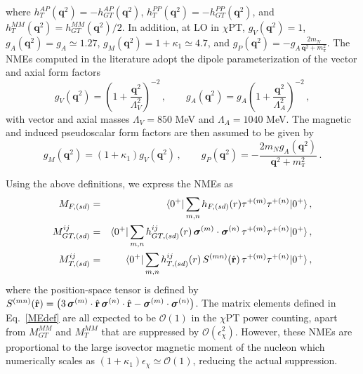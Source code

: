 \documentclass[letterpaper,11pt]{article}
\newcommand{\boldsigma}{\mbox{\boldmath $\sigma$}}
\renewcommand{\vec}[1]{{\mathbf #1}}
\newcommand{\sq}{^{2}}
\newcommand{\nn}{\nonumber}
\begin{document}
where $h^{AP}_T(\vec q^2) = -h^{AP}_{GT}(\vec q^2)$, $h^{PP}_T(\vec q^2) = - h^{PP}_{GT}(\vec q^2)$,  and $h^{MM}_{T}(\vec q^2) = h^{MM}_{GT}(\vec q^2)/2$. In addition, at LO in $\chi$PT, 
$g_V(\vec q^2)=1$,
$g_A(\vec q^2)=g_A\simeq 1.27$, $g_M(\vec q\sq) = 1+\kappa_1\simeq 4.7$,  and 	$g_P(\vec q^2) =-g_A\frac{2m_N}{\vec q\sq+m_\pi\sq}$. 
The NMEs computed in the literature \cite{Hyvarinen:2015bda,Menendez:2017fdf,Barea:2015kwa,Barea} adopt the dipole parameterization of the vector and axial form factors 
\begin{equation}\label{dipole}
g_V(\vec q^2) =  \left(1 + \frac{\vec q^2}{\Lambda_V^2}\right)^{-2}\,, \qquad  g_A(\vec q^2) =  g_A \left(1 + \frac{\vec q^2}{\Lambda_A^2}\right)^{-2}\,, 
\end{equation}
with vector and axial masses $\Lambda_V = 850$ MeV and $\Lambda_A = 1040$ MeV. 
The magnetic and induced pseudoscalar form factors are then assumed to be given by
\begin{equation}\label{assumption}
g_M(\vec q^2) = (1 + \kappa_1) g_V(\vec q^2)\,, \qquad g_P(\vec q^2) = -\frac{2 m_N g_A(\vec q^2)}{\vec q^2 + m_\pi^2}\,.
\end{equation}


Using the above definitions, we express the NMEs as
\begin{eqnarray}\label{MEdef}
M_{F,(sd)}         &=&  \langle 0^+ | \sum_{m,n} h_{F,(sd)}(r) \tau^{+(m)} \tau^{+(n)}  | 0^+ \rangle\,, \nn\\
M^{ij}_{GT,(sd)} &=&  \langle 0^+ | \sum_{m,n} h^{ij}_{GT,(sd)}(r) \, \boldsigma^{(m)} \cdot \boldsigma^{(n)} \, \tau^{+(m)} \tau^{+(n)} | 0^+ \rangle\,, \nn\\
M^{ij}_{T,(sd)} &=&  \langle 0^+ | \sum_{m,n} h^{ij}_{ T,(sd)}(r) \, S^{(mn)}(\hat{\vec r}) \, \tau^{+(m)} \tau^{+(n)} | 0^+ \rangle\,, 
\end{eqnarray}
where the position-space tensor is defined by $S^{(mn)}(\hat{\vec r}) = \left( 3\,\boldsigma^{(m)} \cdot  \hat{ \vec r} \, \boldsigma^{(n)} \cdot  \hat{ \vec r} - \boldsigma^{(m)}\cdot \boldsigma^{(n)} \right)$. 
The matrix elements defined in Eq.~\eqref{MEdef} are all expected to be $\mathcal O(1)$ in the $\chi$PT power counting, apart from  $M^{MM}_{GT}$ and  $M^{MM}_{T}$ that are suppressed by 
$\mathcal O(\epsilon_\chi^2)$. However, these NMEs are proportional to the  large isovector magnetic moment of the nucleon which numerically scales as $(1+\kappa_1)\epsilon_\chi \simeq \mathcal O(1)$,
reducing the actual suppression.
 
\end{document}
